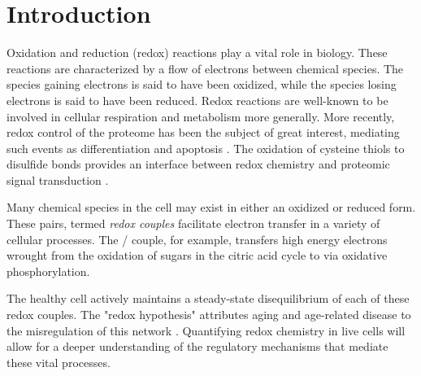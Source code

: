 
\chapter{Introduction} %

\label{Chapter1} %


Oxidation and reduction (redox) reactions play a vital role in biology. These reactions are characterized by a flow of electrons between chemical species. The species gaining electrons is said to have been oxidized, while the species losing electrons is said to have been reduced. Redox reactions are well-known to be involved in cellular respiration and metabolism more generally. More recently, redox control of the proteome has been the subject of great interest, mediating such events as differentiation and apoptosis \cite{circu2010}. The oxidation of cysteine thiols to disulfide bonds provides an interface between redox chemistry and proteomic signal transduction \cite{meyer2010}.

Many chemical species in the cell may exist in either an oxidized or reduced form. These pairs, termed \textit{redox couples} facilitate electron transfer in a variety of cellular processes. The / couple, for example, transfers high energy electrons wrought from the oxidation of sugars in the citric acid cycle to  via oxidative phosphorylation.


The healthy cell actively maintains a steady-state disequilibrium of each of these redox couples. The "redox hypothesis" attributes aging and age-related disease to the misregulation of this network \cite{jones2008}. Quantifying redox chemistry in live cells will allow for a deeper understanding of the regulatory mechanisms that mediate these vital processes.

